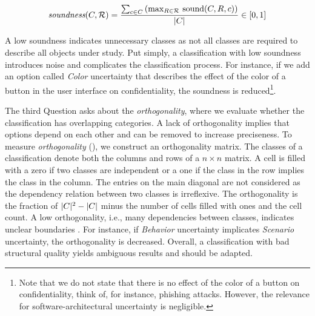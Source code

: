 \begin{equation*}
  {\emph{soundness}}(C,\mathcal{R}) = \frac{\sum\nolimits_{c\in C}\,(\max\nolimits_{R\in\mathcal{R}}\,\text{sound}(C,R,c))}{\lvert C\rvert} \in [0,1]
\end{equation*}

A low soundness indicates unnecessary classes as not all classes are required to describe all objects under study.
Put simply, a classification with low soundness introduces noise and complicates the classification process.
For instance, if we add an option called \emph{Color} uncertainty that describes the effect of the color of a button in the user interface on confidentiality, the soundness is reduced\footnote{Note that we do not state that there is no effect of the color of a button on confidentiality, think of, for instance, phishing attacks. However, the relevance for software-architectural uncertainty is negligible.}.

\label{gqm:text:q:1:3}
The third Question  asks about the \emph{orthogonality}, where we evaluate whether the classification has overlapping categories.
A lack of orthogonality implies that options depend on each other and can be removed to increase preciseness.
To measure \emph{orthogonality} (\label{gqm:text:m:1:3:1}), we construct an orthogonality matrix.
The classes of a classification denote both the columns and rows of a $n \times n$ matrix.
A cell is filled with a zero if two classes are independent or a one if the class in the row implies the class in the column.
The entries on the main diagonal are not considered as the dependency relation between two classes is irreflexive.
The orthogonality is the fraction of $\lvert C\rvert^2 - \lvert C\rvert$ minus the number of cells filled with ones and the cell count.
A low orthogonality, i.e., many dependencies between classes, indicates unclear boundaries \cite{bedford_evaluating_2013}.
For instance, if \emph{Behavior} uncertainty implicates \emph{Scenario} uncertainty, the orthogonality is decreased.
Overall, a classification with bad structural quality yields ambiguous results and should be adapted.


